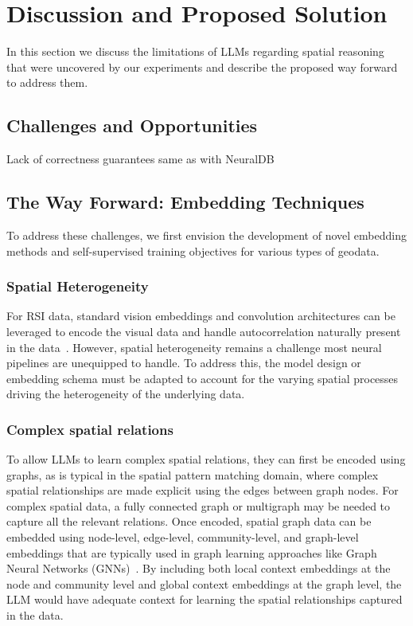 \section{Discussion and Proposed Solution}
\label{section:proposal}

In this section we discuss the limitations of LLMs regarding spatial reasoning that were uncovered by our experiments and describe the proposed way forward to address them.

\subsection{Challenges and Opportunities}



Lack of correctness guarantees same as with NeuralDB

\subsection{The Way Forward: Embedding Techniques}
To address these challenges, we first envision the development of novel embedding methods and self-supervised training objectives for various types of geodata.

\subsubsection{Spatial Heterogeneity} %
For RSI data, standard vision embeddings and convolution architectures can be leveraged to encode the visual data and handle autocorrelation naturally present in the data~\cite{Xie2021}.
However, spatial heterogeneity remains a challenge most neural pipelines are unequipped to handle.
To address this, the model design or embedding schema must be adapted to account for the varying spatial processes driving the heterogeneity of the underlying data.

\subsubsection{Complex spatial relations} %
To allow LLMs to learn complex spatial relations, they can first be encoded using graphs, as is typical in the spatial pattern matching domain, where complex spatial relationships are made explicit using the edges between graph nodes.
For complex spatial data, a fully connected graph or multigraph may be needed to capture all the relevant relations. 
Once encoded, spatial graph data can be embedded using node-level, edge-level, community-level, and graph-level embeddings that are typically used in graph learning approaches like Graph Neural Networks (GNNs)~\cite{Bai2019,Krlevza2016,Liu2020Neural}.
By including both local context embeddings at the node and community level and global context embeddings at the graph level, the LLM would have adequate context for learning the spatial relationships captured in the data.

